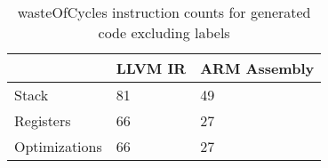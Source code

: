 \begin{table}[h!]
\centering
\begin{tabular}{p{}p{}p{}}
  \hline
 & LLVM IR & ARM Assembly \\ 
  \hline
Stack &  81 &  49 \\ 
  Registers &  66 &  27 \\ 
  Optimizations &  66 &  27 \\ 
   \hline
\end{tabular}
\caption{wasteOfCycles instruction counts for generated code excluding labels}
\end{table}
